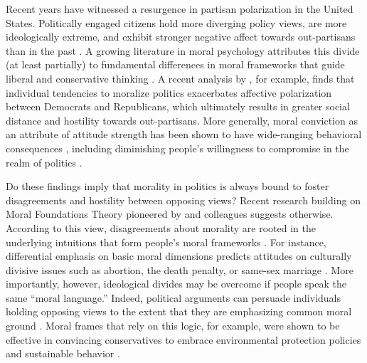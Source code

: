 Recent years have witnessed a resurgence in partisan polarization in the United States. Politically engaged citizens hold more diverging policy
views, are more ideologically extreme, and exhibit stronger negative affect towards out-partisans than in the past \citep{hetherington2001resurgent, abramowitz2008polarization, iyengar2012affect, mason2014disrespectfully, huddy2015expressive, iyengar2015fear}. A growing literature in moral psychology attributes this divide (at least partially) to fundamental differences in moral frameworks that guide liberal and conservative thinking \citep[e.g.,][]{haidt2012righteous,graham2013moral}. A recent analysis by \citet{garrett2018moral}, for example, finds that individual tendencies to moralize politics exacerbates affective polarization between Democrats and Republicans, which ultimately results in greater social distance and hostility towards out-partisans. More generally, moral conviction as an attribute of attitude strength has been shown to have wide-ranging behavioral consequences \citep{skitka2005moral,skitka2014social}, including diminishing people's willingness to compromise in the realm of politics \citep{ryan2014reconsidering,ryan2017no}.

Do these findings imply that morality in politics is always bound to foster disagreements and hostility between opposing views? Recent research building on Moral Foundations Theory pioneered by \citet{haidt2007new} and colleagues suggests otherwise. According to this view, disagreements about morality are rooted in the underlying intuitions that form people's moral frameworks \citep{haidt2012righteous}. For instance, differential emphasis on basic moral dimensions predicts attitudes on culturally divisive issues such as abortion, the death penalty, or same-sex marriage \citep{koleva2012tracing}. More importantly, however, ideological divides may be overcome if people speak the same ``moral language.'' Indeed, political arguments can persuade individuals holding opposing views to the extent that they are emphasizing common moral ground \citep[e.g.,][]{day2014shifting,feinberg2015gulf}. Moral frames that rely on this logic, for example, were shown to be effective in convincing conservatives to embrace environmental protection policies and sustainable behavior \citep{kidwell2013getting,feinberg2013moral}.

